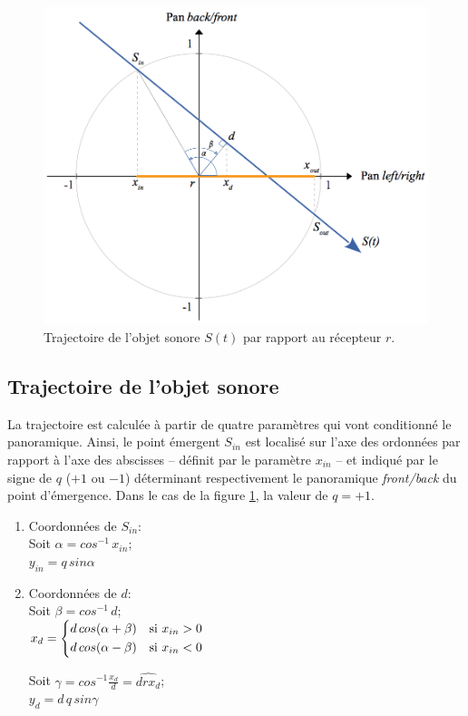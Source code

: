 \begin{figure}[H]
\begin{center}
\includegraphics[scale=0.31]{img/4782}
\caption{Trajectoire de l'objet sonore $S(t)$ par rapport au r\'ecepteur $r$. }
\label{tra}
\end{center}
\end{figure}

\subsection*{Trajectoire de l'objet sonore}

La trajectoire est calcul\'ee \`a partir de quatre param\`etres qui vont conditionn\'e le panoramique. Ainsi, le point \'emergent $S_{in}$ est localis\'e  sur l'axe des ordonn\'ees par rapport \`a l'axe des abscisses -- d\'efinit par le param\`etre $x_{in}$ -- et indiqu\'e par le signe de $q$  ($+1$ ou $-1$) d\'eterminant respectivement le panoramique \textit{front/back} du point d'\'emergence. Dans le cas de la figure \ref{tra}, la valeur de  $q=+1$.%

\begin{enumerate}
\item Coordonn\'ees de $S_{in}$:\\  
Soit $\alpha = cos^{-1} \,x_{in}$;\\
$y_{in}=q\, sin \alpha$
\item Coordonn\'ees de $d$:\\ 
Soit $\beta = cos^{-1} \, d$;\\

$
   x_{d}=
\begin{dcases}
    d\, cos(\alpha + \beta)& \text{si } x_{in}>0\\
    d\, cos(\alpha - \beta)& \text{si } x_{in}<0
\end{dcases}
$

 Soit $\gamma =cos^{-1} \displaystyle \frac{x_d}{d}=\widehat{drx_d}$;\\
 $y_d=d\, q \,sin \gamma$
 \end{enumerate}
 

